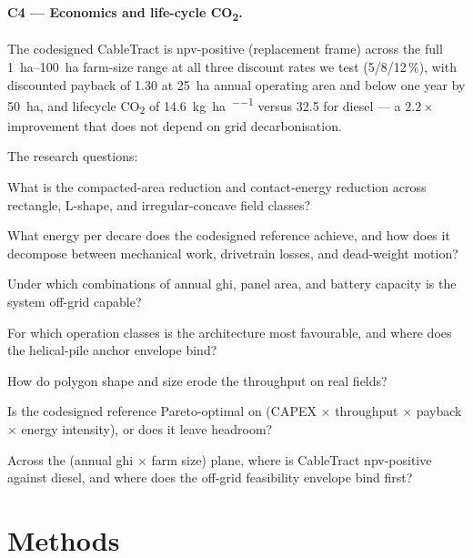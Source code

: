 \documentclass[11pt,a4paper]{article}
\begin{document}
\paragraph{C4 --- Economics and life-cycle CO\textsubscript{2}.} The codesigned CableTract is \gls{npv}-positive (replacement frame) across the full \SIrange{1}{100}{\hectare} farm-size range at all three discount rates we test (5/8/12\,\%), with discounted payback of \SI{1.30}{\year} at \SI{25}{\hectare} annual operating area and below one year by \SI{50}{\hectare}, and lifecycle CO\textsubscript{2} of \SI{14.6}{\kilogram\per\hectare\per\year} versus 32.5 for diesel --- a $2.2\times$ improvement that does not depend on grid decarbonisation.

\medskip
The research questions:

\begin{description}[leftmargin=2.0em,style=nextline,itemsep=0.25em]
    \item[\gls{rq}1] What is the compacted-area reduction and contact-energy reduction across rectangle, L-shape, and irregular-concave field classes?
    \item[\gls{rq}2] What energy per decare does the codesigned reference achieve, and how does it decompose between mechanical work, drivetrain losses, and dead-weight motion?
    \item[\gls{rq}3] Under which combinations of annual \gls{ghi}, panel area, and battery capacity is the system off-grid capable?
    \item[\gls{rq}4] For which operation classes is the architecture most favourable, and where does the helical-pile anchor envelope bind?
    \item[\gls{rq}5] How do polygon shape and size erode the throughput on real fields?
    \item[\gls{rq}6] Is the codesigned reference Pareto-optimal on (CAPEX $\times$ throughput $\times$ payback $\times$ energy intensity), or does it leave headroom?
    \item[\gls{rq}7] Across the (annual \gls{ghi} $\times$ farm size) plane, where is CableTract \gls{npv}-positive against diesel, and where does the off-grid feasibility envelope bind first?
\end{description}

\section{Methods}\label{sec:methods}
\end{document}
